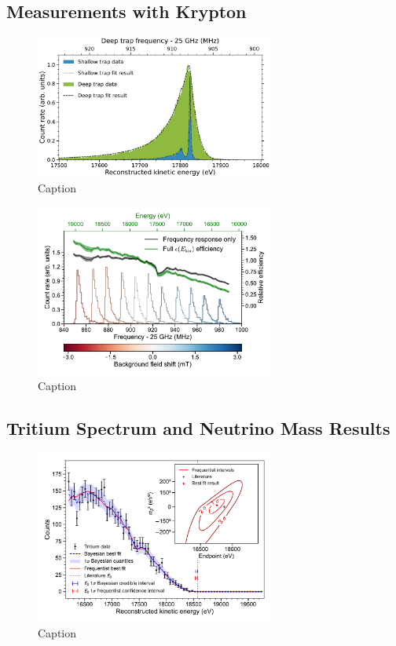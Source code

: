 \subsection{Measurements with Krypton}

\begin{figure}[htbp]
    \centering
    \includegraphics[width=0.7\textwidth]{figs/Chapter-3/kr_fit.pdf}
    \caption{Caption}
    \label{fig:krypton_fit}
\end{figure}

\begin{figure}[htbp]
    \centering
    \includegraphics[width=0.7\textwidth]{figs/Chapter-3/fss_for_prl_plot.pdf}
    \caption{Caption}
    \label{fig:fss_plot}
\end{figure}

\subsection{Tritium Spectrum and Neutrino Mass Results}

\begin{figure}
    \centering
    \includegraphics[width=0.7\textwidth]{figs/Chapter-3/12-03-22A_final_E0_real_data_phase_II_tritium_fit_1d.pdf}
    \caption{Caption}
    \label{fig:final_tritium_fit}
\end{figure}

